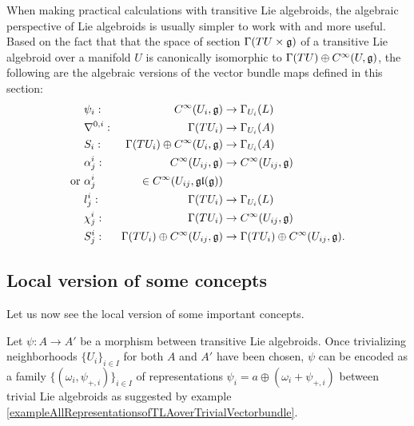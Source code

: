 
\lin

When making practical calculations with transitive Lie algebroids, the algebraic perspective of Lie algebroids is usually simpler to work with and more useful. Based on the fact that that the space of section $\Gamma(TU\times \mathfrak{g})$ of a transitive Lie algebroid over a manifold $U$ is canonically isomorphic to $\Gamma(TU) \oplus C^\infty(U, \mathfrak{g})$, the following are the algebraic versions of the vector bundle maps defined in this section:
\begin{align*}
    &\psi_i:& C^\infty(U_i, \mathfrak{g}) &\to \Gamma_{U_i}(L)\\
    &\nabla^{0, i}:& \Gamma(TU_i) &\to \Gamma_{U_i}(A)\\
    &S_i:& \Gamma(TU_i)\oplus C^\infty(U_i, \mathfrak{g}) &\to \Gamma_{U_i}(A)\\
    &\alpha^i_j:& C^\infty(U_{ij}, \mathfrak{g}) &\to C^\infty(U_{ij}, \mathfrak{g}) \\
    \text{or   } &\alpha^i_j& \in C^\infty(U_{ij}, \mathfrak{gl}(\mathfrak{g})) \\
    &l^i_j:& \Gamma(TU_i) &\to \Gamma_{U_i}(L)\\
    &\chi^i_j:& \Gamma(TU_i) &\to C^\infty(U_{ij}, \mathfrak{g}) \\
    &S^i_j:& \Gamma(TU_i)\oplus C^\infty(U_{ij}, \mathfrak{g}) &\to \Gamma(TU_i)\oplus C^\infty(U_{ij}, \mathfrak{g}).
\end{align*}

\subsection{Local version of some concepts} \label{chBasicsubsectionLocalVersion}
Let us now see the local version of some important concepts.

Let $\psi: A \to A'$ be a morphism between transitive Lie algebroids. Once trivializing neighborhoods $\{U_i\}_{i \in I}$ for both $A$ and $A'$ have been chosen, $\psi$ can be encoded as a family $\{(\omega_i, \psi_{+, i})\}_{i\in I}$ of representations $\psi_i = a \oplus (\omega_i + \psi_{+,i})$ between trivial Lie algebroids as suggested by example \ref{exampleAllRepresentationsofTLAoverTrivialVectorbundle}.

\lin

